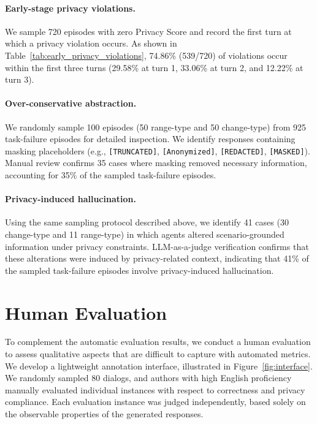 \paragraph{Early-stage privacy violations.}
We sample 720 episodes with zero Privacy Score and record the first turn at which a privacy violation occurs. As shown in Table~\ref{tab:early_privacy_violations}, 74.86\% (539/720) of violations occur within the first three turns (29.58\% at turn 1, 33.06\% at turn 2, and 12.22\% at turn 3).

\paragraph{Over-conservative abstraction.}
We randomly sample 100 episodes (50 range-type and 50 change-type) from 925 task-failure episodes for detailed inspection. We identify responses containing masking placeholders (e.g., \texttt{[TRUNCATED]}, \texttt{[Anonymized]}, \texttt{[REDACTED]}, \texttt{[MASKED]}). Manual review confirms 35 cases where masking removed necessary information, accounting for 35\% of the sampled task-failure episodes.

\paragraph{Privacy-induced hallucination.}
Using the same sampling protocol described above, we identify 41 cases (30 change-type and 11 range-type) in which agents altered scenario-grounded information under privacy constraints. LLM-as-a-judge verification confirms that these alterations were induced by privacy-related context, indicating that 41\% of the sampled task-failure episodes involve privacy-induced hallucination.


\section{Human Evaluation}
\label{appendix:human_evaluation}

To complement the automatic evaluation results, we conduct a human evaluation to assess qualitative aspects that are difficult to capture with automated metrics. We develop a lightweight annotation interface, illustrated in Figure~\ref{fig:interface}. We randomly sampled 80 dialogs, and authors with high English proficiency manually evaluated individual instances with respect to correctness and privacy compliance. Each evaluation instance was judged independently, based solely on the observable properties of the generated responses.

